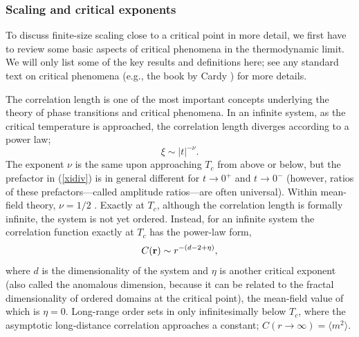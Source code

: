 \documentclass[draft,numberedheadings]{aipproc}
\begin{document}
\subsubsection{Scaling and critical exponents}

To discuss finite-size scaling close to a critical point in more detail, we first have to review some basic aspects of critical phenomena in the thermodynamic 
limit. We will only list some of the key results and definitions here; see any standard text on critical phenomena (e.g., the book by Cardy \cite{cardy}) for 
more details.

The correlation length is one of the most important concepts underlying the theory of phase transitions and critical phenomena. In an infinite system, 
as the critical temperature is approached, the correlation length diverges according to a power law;
\begin{equation}
\xi \sim |t|^{-\nu}.
\label{xidiv}
\end{equation}
The exponent $\nu$ is the same upon approaching $T_c$ from above or below, but the prefactor in (\ref{xidiv}) is in general different for $t \to 0^+$ and 
$t \to 0^-$ (however, ratios of these prefactors---called amplitude ratios---are often universal). Within mean-field theory, $\nu=1/2$ . Exactly at $T_c$, 
although the correlation length is formally infinite, the system is not yet ordered. Instead, for an infinite system the correlation function exactly at $T_c$ 
has the power-law form, 
\begin{equation}
C({\bf r}) \sim r^{-(d-2+\eta)},
\label{cofreta}
\end{equation}
where $d$ is the dimensionality of the system and $\eta$ is another critical exponent (also called the anomalous dimension, because it can be related
to the fractal dimensionality of ordered domains at the critical point), the mean-field value of which is $\eta=0$. Long-range order sets in only infinitesimally 
below $T_c$, where the asymptotic long-distance correlation approaches a constant; $C(r \to \infty) = \langle m^2\rangle$.
\end{document}
